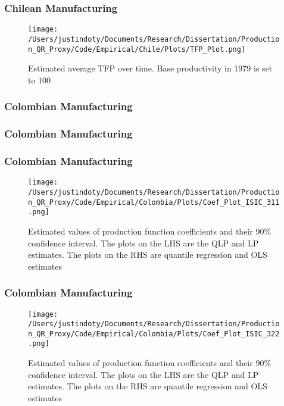 \documentclass{beamer}
\begin{document}
\begin{frame}
\frametitle{Chilean Manufacturing}
\begin{figure}[ht]
\centering
\texttt{[image: /Users/justindoty/Documents/Research/Dissertation/Production\_QR\_Proxy/Code/Empirical/Chile/Plots/TFP\_Plot.png]}
\caption{Estimated average TFP over time. Base productivity in 1979 is set to 100}
\end{figure}
\end{frame}


\begin{frame}
\frametitle{Colombian Manufacturing}
\scriptsize

\end{frame}

\begin{frame}
\frametitle{Colombian Manufacturing}
\scriptsize

\end{frame}

\begin{frame}
\frametitle{Colombian Manufacturing}
\begin{figure}[ht]
\centering
\texttt{[image: /Users/justindoty/Documents/Research/Dissertation/Production\_QR\_Proxy/Code/Empirical/Colombia/Plots/Coef\_Plot\_ISIC\_311.png]}
\caption{Estimated values of production function coefficients and their 90\% confidence interval. The plots on the LHS are the QLP and LP estimates. The plots on the RHS are quantile regression and OLS estimates}
\end{figure}
\end{frame}

\begin{frame}
\frametitle{Colombian Manufacturing}
\begin{figure}[ht]
\centering
\texttt{[image: /Users/justindoty/Documents/Research/Dissertation/Production\_QR\_Proxy/Code/Empirical/Colombia/Plots/Coef\_Plot\_ISIC\_322.png]}
\caption{Estimated values of production function coefficients and their 90\% confidence interval. The plots on the LHS are the QLP and LP estimates. The plots on the RHS are quantile regression and OLS estimates}
\end{figure}
\end{frame}
\end{document}
